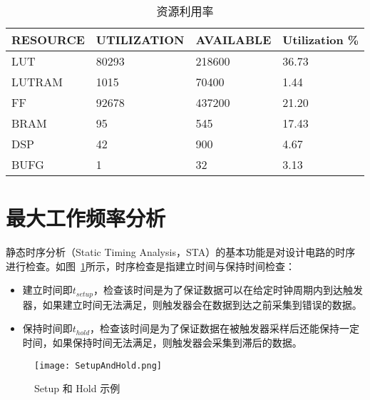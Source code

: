 \begin{table}[!htbp]
    \caption{资源利用率}
    \label{tab:Resource Report}
    \centering
    \footnotesize%
    \setlength{\tabcolsep}{4pt}%
    \renewcommand{\arraystretch}{1.2}%
    \begin{tabular}{llll}
        \toprule
        \textbf{RESOURCE} & \textbf{UTILIZATION} & \textbf{AVAILABLE} & \textbf{Utilization \%} \\
        \midrule
        LUT               & 80293                & 218600               & 36.73                   \\
        LUTRAM            & 1015                 & 70400                & 1.44                    \\
        FF                & 92678                & 437200               & 21.20                   \\
        BRAM              & 95                   & 545                  & 17.43                   \\
        DSP               & 42                   & 900                  & 4.67                    \\
        BUFG              & 1                    & 32                   & 3.13                    \\
        \bottomrule                   
    \end{tabular}
\end{table}


\section{最大工作频率分析}

静态时序分析（Static Timing Analysis，STA）的基本功能是对设计电路的时序进行检查。如图~\ref{fig:Setup and Hold}所示，时序检查是指建立时间与保持时间检查：

\begin{itemize}
    \item 建立时间即$t_{setup}$，检查该时间是为了保证数据可以在给定时钟周期内到达触发器，如果建立时间无法满足，则触发器会在数据到达之前采集到错误的数据。
    \item 保持时间即$t_{hold}$，检查该时间是为了保证数据在被触发器采样后还能保持一定时间，如果保持时间无法满足，则触发器会采集到滞后的数据。
\end{itemize}

\begin{figure}[!htbp]
    \centering
    \texttt{[image: SetupAndHold.png]}
    \caption{Setup 和 Hold 示例}
    \label{fig:Setup and Hold}
\end{figure}

